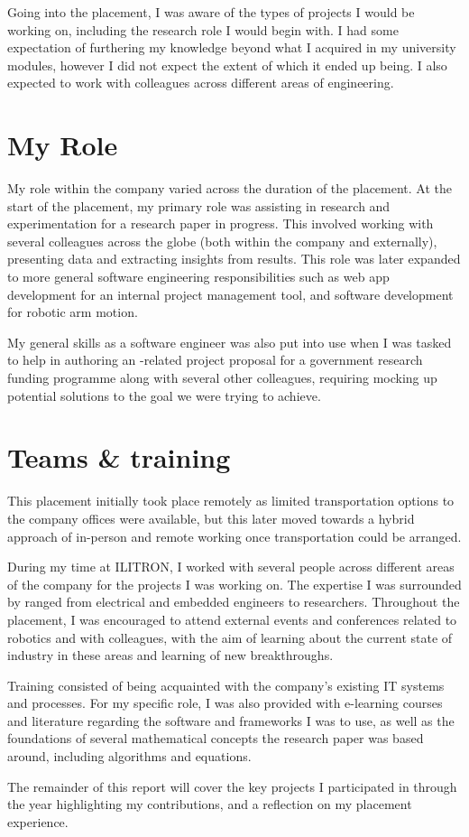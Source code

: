 Going into the placement, I was aware of the types of projects I would be working on, including the
research role I would begin with. I had some expectation of furthering my  knowledge beyond
what I acquired in my university modules, however I did not expect the extent of which it ended up
being. I also expected to work with colleagues across different areas of engineering.

\section{My Role}

My role within the company varied across the duration of the placement. At the start of the
placement, my primary role was assisting in research and experimentation for a research paper in
progress. This involved working with several colleagues across the globe (both within the company
and externally), presenting data and extracting insights from results. This role was later expanded
to more general software engineering responsibilities such as web app development for an internal
project management tool, and software development for robotic arm motion.

My general skills as a software engineer was also put into use when I was tasked to help in
authoring an -related project proposal for a government research funding programme along
with several other colleagues, requiring mocking up potential solutions to the goal we were trying
to achieve.

\section{Teams \& training}

This placement initially took place remotely as limited transportation options to the company
offices were available, but this later moved towards a hybrid approach of in-person and remote
working once transportation could be arranged.

During my time at ILITRON, I worked with several people across different areas of the company for
the projects I was working on. The expertise I was surrounded by ranged from electrical and embedded
engineers to  researchers. Throughout the placement, I was encouraged to attend external
events and conferences related to robotics and  with colleagues, with the aim
of learning about the current state of industry in these areas and learning of new breakthroughs.

Training consisted of being acquainted with the company's existing IT systems and processes. For my
specific role, I was also provided with e-learning courses and literature regarding the software and
 frameworks I was to use, as well as the foundations of several mathematical concepts the
research paper was based around, including  algorithms and  equations.

The remainder of this report will cover the key projects I participated in through the year
highlighting my contributions, and a reflection on my placement experience.

